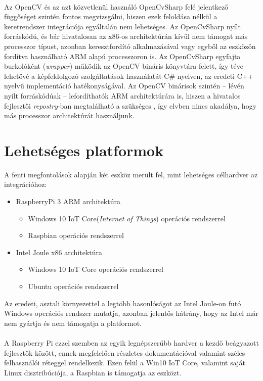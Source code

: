 \\
Az OpenCV és az azt közvetlenül használó OpenCvSharp felé jelentkező függőséget szintén fontos megvizsgálni, hiszen ezek feloldása nélkül a keretrendszer integrációja egyáltalán nem lehetséges. Az OpenCvSharp nyílt forráskódú, és bár hivatalosan az x86-os architektúrán kívül nem támogat más processzor típust, azonban keresztfordító alkalmazásával vagy egyből az eszközön fordítva használható ARM alapú processzoron is. Az OpenCvSharp egyfajta burkolóként (\emph{wrapper}) működik az OpenCV bináris könyvtára felett, így téve lehetővé a képfeldolgozó szolgáltatások használatát C\# nyelven, az eredeti C++ nyelvű implementáció hatékonyságával. Az OpenCV binárisok szintén -- lévén nyílt forráskódúak -- lefordíthatók ARM architektúrára is, hiszen a hivatalos fejlesztői \textit{repostry}-ban megtalálható a szükséges , így elvben nincs akadálya, hogy más processzor architektúrát használjunk. \\

\section{Lehetséges platformok}

A fenti megfontolások alapján két eszköz merült fel, mint lehetséges célhardver az integrációhoz:
\begin{itemize}
\item RaspberryPi 3 ARM architektúra
\begin{itemize}
\item Windows 10 IoT Core(\emph{Internet of Things}) operációs rendszerrel
\item Raspbian operációs rendszerrel
\end{itemize}
\item Intel Joule x86 architektúra
\begin{itemize}
\item Windows 10 IoT Core operációs rendszerrel
\item Ubuntu operációs rendszerrel 
\end{itemize}
\end{itemize}

Az eredeti, asztali környezettel a legtöbb hasonlóságot az Intel Joule-on futó Windows operációs rendszer mutatja, azonban jelentős hátrány, hogy az Intel már nem gyártja és nem támogatja a platformot.\\
\\
A Raspberry Pi ezzel szemben az egyik legnépszerűbb hardver a kezdő beágyazott fejlesztők között, ennek megfelelően részletes dokumentációval valamint széles felhasználói réteggel rendelkezik. Ezen felül a Win10 IoT Core, valamint saját Linux disztribúciója, a Raspbian is támogatja az eszközt.

